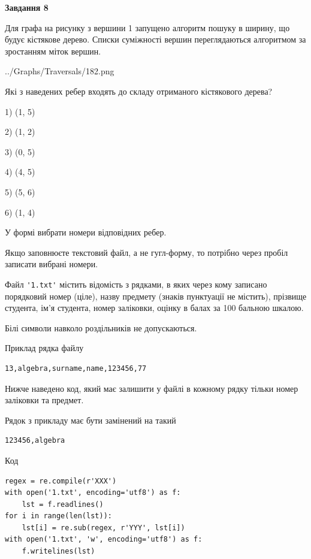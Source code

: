 \documentclass[12pt, ukrainian]{article}
\def\code#1{\Verb!#1!}
\begin{document}
{\begin {large}
{\begin {center}\textbf{Завдання 8}\end {center}}\par
Для графа на рисунку з вершини 1 запущено алгоритм пошуку в ширину, що будує кістякове дерево. Списки суміжності вершин переглядаються алгоритмом за зростанням міток вершин.\par
\begin{center}
	{../Graphs/Traversals/182.png}
\end{center}
\par Які з наведених ребер входять до складу отриманого кістякового дерева?\par
1) (1, 5)\par
2) (1, 2)\par
3) (0, 5)\par
4) (4, 5)\par
5) (5, 6)\par
6) (1, 4)\par
{\vskip 15pt} У формі вибрати номери відповідних ребер.


Якщо заповнюєте текстовий файл, а не гугл-форму, то потрібно через пробіл записа\-ти вибрані номери.\par
\newpage


Файл \code{'1.txt'} містить відомість з рядками, в яких через кому записано поряд\-ковий номер (ціле), назву предмету (знаків пунктуації не містить), прізвище студента, ім'я студента, номер заліковки, оцінку в балах за 100 бальною шкалою.

Білі символи навколо роздільників не допускаються.

Приклад рядка файлу



\begin{verbatim}
13,algebra,surname,name,123456,77
\end{verbatim}


Нижче наведено код, який має залишити у файлі в кожному рядку тільки номер заліковки та предмет.

Рядок з прикладу має бути замінений на такий



\begin{verbatim}
123456,algebra
\end{verbatim}




Код



\begin{verbatim}
regex = re.compile(r'XXX')
with open('1.txt', encoding='utf8') as f:
    lst = f.readlines()
for i in range(len(lst)):
    lst[i] = re.sub(regex, r'YYY', lst[i])
with open('1.txt', 'w', encoding='utf8') as f:
    f.writelines(lst)
\end{verbatim}







\end{large}}
\end{document}
